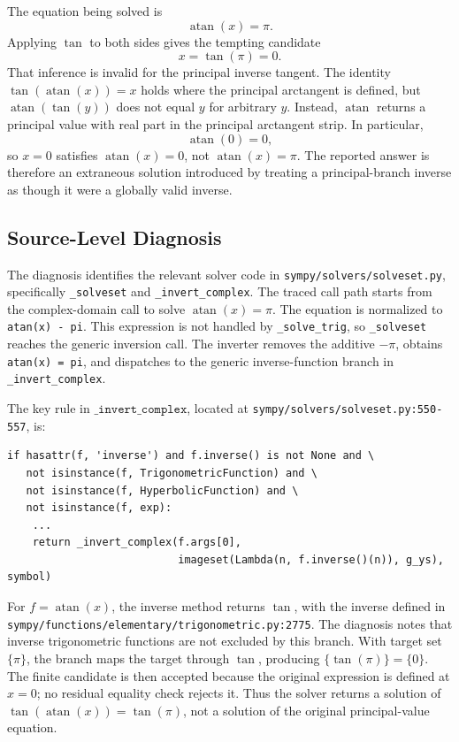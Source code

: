 \documentclass[11pt]{article}
\begin{document}
The equation being solved is
\[
  \operatorname{atan}(x) = \pi.
\]
Applying \(\tan\) to both sides gives the tempting candidate
\[
  x = \tan(\pi) = 0.
\]
That inference is invalid for the principal inverse tangent.  The identity
\(\tan(\operatorname{atan}(x)) = x\) holds where the principal arctangent is
defined, but \(\operatorname{atan}(\tan(y))\) does not equal \(y\) for arbitrary
\(y\).  Instead, \(\operatorname{atan}\) returns a principal value with real part
in the principal arctangent strip.  In particular,
\[
  \operatorname{atan}(0) = 0,
\]
so \(x = 0\) satisfies \(\operatorname{atan}(x) = 0\), not
\(\operatorname{atan}(x) = \pi\).  The reported answer is therefore an
extraneous solution introduced by treating a principal-branch inverse as though
it were a globally valid inverse.

\subsection{Source-Level Diagnosis}

\begin{sloppypar}
The diagnosis identifies the relevant solver code in
\nolinkurl{sympy/solvers/solveset.py}, specifically \texttt{\_solveset} and
\texttt{\_invert\_complex}.  The traced call path starts from the complex-domain
call to solve \(\operatorname{atan}(x) = \pi\).  The equation is normalized to
\texttt{atan(x) - pi}.  This expression is not handled by \texttt{\_solve\_trig},
so \texttt{\_solveset} reaches the generic inversion call.  The inverter removes
the additive \(-\pi\), obtains \texttt{atan(x) = pi}, and dispatches to the
generic inverse-function branch in \texttt{\_invert\_complex}.
\end{sloppypar}

The key rule in \(\texttt{\_invert\_complex}\), located at
\nolinkurl{sympy/solvers/solveset.py:550-557}, is:

\begin{lstlisting}[style=bugpython]
if hasattr(f, 'inverse') and f.inverse() is not None and \
   not isinstance(f, TrigonometricFunction) and \
   not isinstance(f, HyperbolicFunction) and \
   not isinstance(f, exp):
    ...
    return _invert_complex(f.args[0],
                           imageset(Lambda(n, f.inverse()(n)), g_ys), symbol)
\end{lstlisting}

For \(f = \operatorname{atan}(x)\), the inverse method returns \(\tan\), with the
inverse defined in \nolinkurl{sympy/functions/elementary/trigonometric.py:2775}.
The diagnosis notes that inverse trigonometric functions are not excluded by
this branch.  With target set \(\{\pi\}\), the branch maps the target through
\(\tan\), producing \(\{\tan(\pi)\} = \{0\}\).  The finite candidate is then
accepted because the original expression is defined at \(x = 0\); no residual
equality check rejects it.  Thus the solver returns a solution of
\(\tan(\operatorname{atan}(x)) = \tan(\pi)\), not a solution of the original
principal-value equation.
\end{document}
